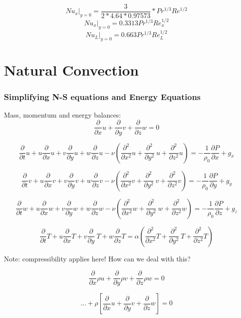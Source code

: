 \documentclass[11pt]{article}
\begin{document}
$$Nu_x |_{y=0} = \frac{3}{2 *4.64 *0.97573} * Pr^{1/3} Re^{1/2}$$
$$Nu_x |_{y=0} = 0.3313 Pr^{1/3} Re_x^{1/2}$$
$$Nu_L |_{y=0} = 0.663 Pr^{1/3} Re_L^{1/2}$$


\part{Natural Convection}

\section{Simplifying N-S equations and Energy Equations}

Mass, momentum and energy balances:
$$  \frac{\partial}{\partial x} u +  \frac{\partial}{\partial y} v +  \frac{\partial}{\partial z} w = 0$$


$$\frac{\partial }{\partial t} u + u \frac{\partial}{\partial x} u + v \frac{\partial}{\partial y} u + w \frac{\partial}{\partial z} u - \nu ( \frac{\partial^2}{\partial x^2} u + \frac{\partial^2}{\partial y^2} \ u + \frac{\partial^2}{\partial z^2} u) = - \frac{1}{\rho_0} \frac{\partial P}{\partial x} +g_x$$

$$\frac{\partial }{\partial t} v + u \frac{\partial}{\partial x} v + v \frac{\partial}{\partial y} v + w \frac{\partial}{\partial z} v - \nu ( \frac{\partial^2}{\partial x^2} v + \frac{\partial^2}{\partial y^2} \ v + \frac{\partial^2}{\partial z^2} v) = - \frac{1}{\rho_0} \frac{\partial P}{\partial y} +g_y$$

$$\frac{\partial }{\partial t} w + u \frac{\partial}{\partial x} w + v \frac{\partial}{\partial y} w + w \frac{\partial}{\partial z} w - \nu ( \frac{\partial^2}{\partial x^2} w + \frac{\partial^2}{\partial y^2} \ w + \frac{\partial^2}{\partial z^2} w) = - \frac{1}{\rho_0} \frac{\partial P}{\partial z} +g_z$$


$$\frac{\partial }{\partial t} T + u \frac{\partial}{\partial x} T + v \frac{\partial }{\partial y} \ T + w \frac{\partial }{\partial z} T  = \alpha ( \frac{\partial^2}{\partial x^2} T +  \frac{\partial^2 }{\partial y^2} \ T +  \frac{\partial^2 }{\partial z^2} T) $$ 


Note: compressibility applies here! How can we deal with this?

$$  \frac{\partial}{\partial x} \rho u +  \frac{\partial}{\partial y}  \rho v +  \frac{\partial}{\partial z} \rho w = 0$$

$$ ...+ \rho \left[ \frac{\partial}{\partial x} u +  \frac{\partial}{\partial y} v +  \frac{\partial}{\partial z} w \right] = 0$$
\end{document}
